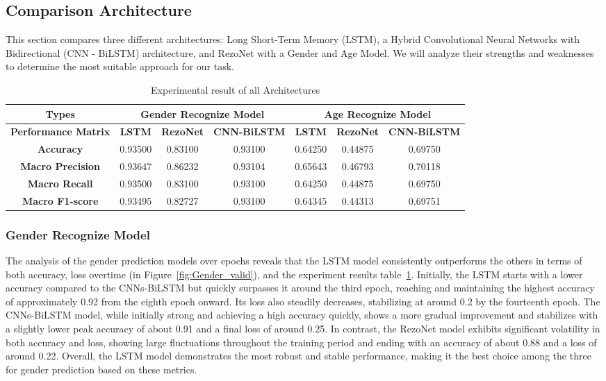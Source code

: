 \documentclass[conference, 10pt,onecolumn]{IEEEtran}
\begin{document}
\subsection{Comparison Architecture}

This section compares three different architectures: Long Short-Term Memory (LSTM), a Hybrid Convolutional Neural Networks with Bidirectional (CNN - BiLSTM) architecture, and RezoNet with a Gender and Age Model. We will analyze their strengths and weaknesses to determine the most suitable approach for our task.

\begin{table}[]
    \centering
    \begin{tabular}{|c|c|c|c|c|c|c|} \hline 
        \textbf{Types} &  \multicolumn{3}{|c|}{\textbf{Gender Recognize Model}}&  \multicolumn{3}{|c|}{\textbf{Age Recognize Model}}\\ \hline
        \textbf{Performance Matrix} & \textbf{LSTM} & \textbf{RezoNet} & \textbf{CNN-BiLSTM} & \textbf{LSTM}& \textbf{RezoNet} & \textbf{CNN-BiLSTM}\\ \hline 
        \textbf{Accuracy} & 0.93500& 0.83100 & 0.93100& 0.64250& 0.44875& 0.69750\\
        \textbf{Macro Precision}& 0.93647& 0.86232& 0.93104& 0.65643& 0.46793& 0.70118\\
        \textbf{Macro Recall}& 0.93500& 0.83100& 0.93100& 0.64250& 0.44875& 0.69750\\
        \textbf{Macro F1-score}& 0.93495& 0.82727& 0.93100& 0.64345& 0.44313& 0.69751\\ \hline
    \end{tabular}
    \caption{Experimental result of all Architectures}
    \label{tab:Experimental result of all Architectures}
\end{table}
\subsubsection{Gender Recognize Model}

The analysis of the gender prediction models over epochs reveals that the LSTM model consistently outperforms the others in terms of both accuracy, loss overtime (in Figure~\ref{fig:Gender_valid}), and the experiment results table~\ref{tab:Experimental result of all Architectures}. Initially, the LSTM starts with a lower accuracy compared to the CNNs-BiLSTM but quickly surpasses it around the third epoch, reaching and maintaining the highest accuracy of approximately 0.92 from the eighth epoch onward. Its loss also steadily decreases, stabilizing at around 0.2 by the fourteenth epoch. The CNNs-BiLSTM model, while initially strong and achieving a high accuracy quickly, shows a more gradual improvement and stabilizes with a slightly lower peak accuracy of about 0.91 and a final loss of around 0.25. In contrast, the RezoNet model exhibits significant volatility in both accuracy and loss, showing large fluctuations throughout the training period and ending with an accuracy of about 0.88 and a loss of around 0.22. Overall, the LSTM model demonstrates the most robust and stable performance, making it the best choice among the three for gender prediction based on these metrics.
\end{document}
